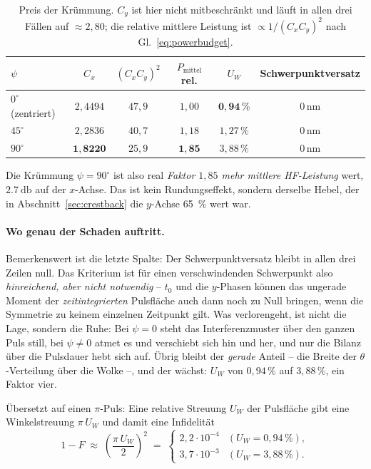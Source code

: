 \documentclass[11pt,a4paper]{article}
\newcommand{\crest}{\ensuremath{C}}
\newcommand{\Uw}{\ensuremath{U_W}}
\begin{document}
\begin{table}[htb]
  \centering
  \caption{Preis der Krümmung. $\crest_y$ ist hier nicht mitbeschränkt und
  läuft in allen drei Fällen auf $\approx 2{,}80$; die relative mittlere
  Leistung ist $\propto 1/(\crest_x\crest_y)^2$ nach
  Gl.~\eqref{eq:powerbudget}.}
  \label{tab:psitrade}
  \begin{tabular}{lccccc}
    \toprule
    $\psi$ & $\crest_x$ & $(\crest_x\crest_y)^2$
           & $P_\mathrm{mittel}$ rel. & $\Uw$ & Schwerpunktversatz\\
    \midrule
    $0^\circ$ (zentriert) & $2{,}4494$ & $47{,}9$ & $1{,}00$ & $\mathbf{0{,}94}\,\%$ & $0$\,nm\\
    $45^\circ$            & $2{,}2836$ & $40{,}7$ & $1{,}18$ & $1{,}27\,\%$ & $0$\,nm\\
    $90^\circ$            & $\mathbf{1{,}8220}$ & $25{,}9$ & $\mathbf{1{,}85}$ & $3{,}88\,\%$ & $0$\,nm\\
    \bottomrule
  \end{tabular}
\end{table}

Die Krümmung $\psi=90^\circ$ ist also real \emph{Faktor $1{,}85$ mehr
mittlere HF-Leistung} wert, $\SI{+2.7}{\decibel}$ auf der $x$-Achse. Das ist
kein Rundungseffekt, sondern derselbe Hebel, der in
Abschnitt~\ref{sec:crestback} die $y$-Achse \SI{65}{\percent} wert war.

\paragraph{Wo genau der Schaden auftritt.}
Bemerkenswert ist die letzte Spalte: Der Schwerpunktversatz bleibt in allen
drei Zeilen null. Das Kriterium ist für einen verschwindenden Schwerpunkt
also \emph{hinreichend, aber nicht notwendig} -- $t_0$ und die
$y$-Phasen können das ungerade Moment der \emph{zeitintegrierten}
Pulsfläche auch dann noch zu Null bringen, wenn die Symmetrie zu keinem
einzelnen Zeitpunkt gilt. Was verlorengeht, ist nicht die Lage, sondern die
Ruhe: Bei $\psi=0$ steht das Interferenzmuster über den ganzen Puls still,
bei $\psi\neq0$ atmet es und verschiebt sich hin und her, und nur die Bilanz
über die Pulsdauer hebt sich auf. Übrig bleibt der \emph{gerade} Anteil --
die Breite der $\theta$-Verteilung über die Wolke --, und der wächst:
$\Uw$ von $0{,}94\,\%$ auf $3{,}88\,\%$, ein Faktor vier.

Übersetzt auf einen $\pi$-Puls: Eine relative Streuung $\Uw$ der Pulsfläche
gibt eine Winkelstreuung $\pi\,\Uw$ und damit eine Infidelität
\begin{equation}
  1-F \;\approx\; \left(\frac{\pi\,\Uw}{2}\right)^{\!2}
  \;=\;
  \begin{cases}
    2{,}2\cdot10^{-4} & (\Uw = 0{,}94\,\%),\\[2pt]
    3{,}7\cdot10^{-3} & (\Uw = 3{,}88\,\%).
  \end{cases}
\end{equation}
\end{document}
